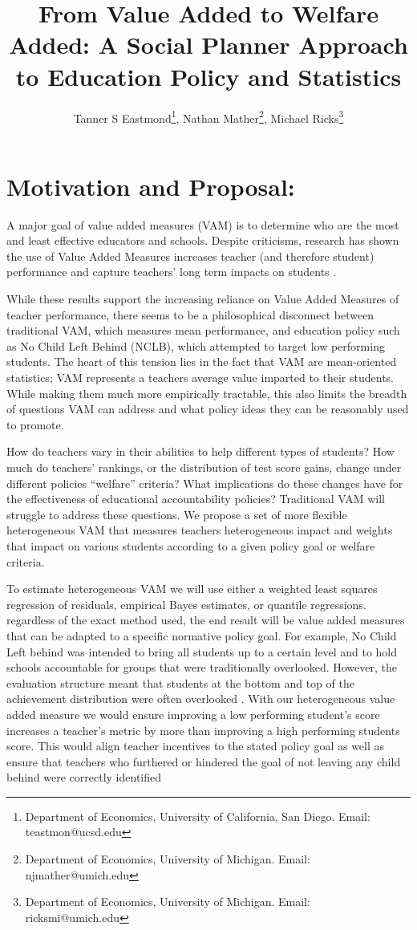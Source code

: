 \documentclass[letterpaper,12pt]{article}
\title{From Value Added to Welfare Added: A Social Planner Approach to Education Policy and Statistics}
\author{Tanner S Eastmond\thanks{Department of Economics, University of California, San Diego. Email: teastmon@ucsd.edu}, Nathan Mather\thanks{Department of Economics, University of Michigan. Email: njmather@umich.edu }, Michael Ricks\thanks{Department of Economics, University of Michigan. Email: ricksmi@umich.edu}}
\date{\vspace{-8ex}}
\begin{document}
\maketitle

\section{Motivation and Proposal:}
A major goal of value added measures (VAM) is to determine who are the most and least effective educators and schools. Despite criticisms, research has shown the use of Value Added Measures increases  teacher (and therefore student) performance and capture teachers' long term impacts on students \citep{chetty2014measuring2, pope2019effect}. 

While these results support the increasing reliance on Value Added Measures of teacher performance, there seems to be a philosophical disconnect between traditional  VAM, which measures mean performance, and education policy such as No Child Left Behind (NCLB), which attempted to target low performing students. The heart of this tension lies in the fact that VAM are mean-oriented statistics; VAM represents a teachers average value imparted to their students. While making them much more empirically tractable, this also limits the breadth of questions VAM can address and what policy ideas they can be reasonably used to promote. 

How do teachers vary in their abilities to help different types of students? How much do teachers' rankings, or the distribution of test score gains, change under different policies ``welfare'' criteria?  What implications do these changes have for the effectiveness of educational accountability policies? Traditional VAM will struggle to address these questions.  We propose a set of more flexible heterogeneous VAM that measures teachers heterogeneous impact and weights that impact on various students according to a given policy goal or welfare criteria. 

To estimate heterogeneous VAM we will use either a weighted least squares regression of residuals, empirical Bayes estimates, or quantile regressions. regardless of the exact method used, the end result will be value added measures that can be adapted to a specific normative policy goal. For example, No Child Left behind was intended to bring all students up to a certain level and to hold schools accountable for groups that were traditionally overlooked. However, the evaluation structure meant that students at the bottom and top of the achievement distribution were often overlooked \citep{neal2010left}. With our heterogeneous value added measure we would ensure improving a low performing student's score increases a teacher's metric by more than improving a high performing students score. This would align teacher incentives to the stated policy goal as well as ensure that teachers who furthered or hindered the goal of not leaving any child behind were correctly identified
\end{document}
